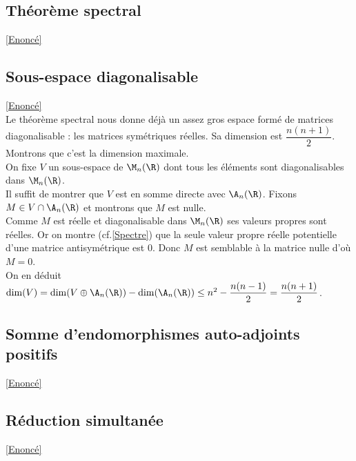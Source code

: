 \documentclass[8pt]{book}
\begin{document}
	\subsection{Théorème spectral}
	\label{Théorème spectral corrigé}
	\textcolor{blue}{\hyperref[Théorème spectral]{[Enoncé]}}\\
	
	\subsection{Sous-espace diagonalisable}
	\label{Sous-espace diagonalisable corrigé}
	\textcolor{blue}{\hyperref[Sous-espace diagonalisable]{[Enoncé]}}\\
	Le théorème spectral nous donne déjà un assez gros espace formé de matrices diagonalisable : les matrices symétriques réelles. Sa dimension est $\dfrac{n(n+1)}{2}$. Montrons que c'est la dimension maximale.\\
	On fixe $V$ un sous-espace de $\M_n(\R)$ dont tous les éléments sont diagonalisables dans $\M_n(\R)$.\\
	Il suffit de montrer que $V$ est en somme directe avec $\A_n(\R)$. Fixons $M\in V\cap\A_n(\R)$ et montrons que $M$ est nulle.\\
	Comme $M$ est réelle et diagonalisable dans $\M_n(\R)$ ses valeurs propres sont réelles. Or on montre (cf.\ref{Spectre}) que la seule valeur propre réelle potentielle d'une matrice antisymétrique est $0$. Donc $M$ est semblable à la matrice nulle d'où $M=0$.\\
	On en déduit $\dim(V)=\dim(V\oplus\A_n(\R))-\dim(\A_n(\R))\leq n^2-\dfrac{n(n-1)}{2}=\dfrac{n(n+1)}{2}$.
	
	\subsection{Somme d'endomorphismes auto-adjoints positifs}
	\label{Somme d'endomorphismes auto-adjoints positifs corrigé}
	\textcolor{blue}{\hyperref[Somme d'endomorphismes auto-adjoints positifs]{[Enoncé]}}\\
	
	\subsection{Réduction simultanée}
	\label{Réduction simultanée corrigé}
	\textcolor{blue}{\hyperref[Réduction simultanée]{[Enoncé]}}\\
	
\end{document}
